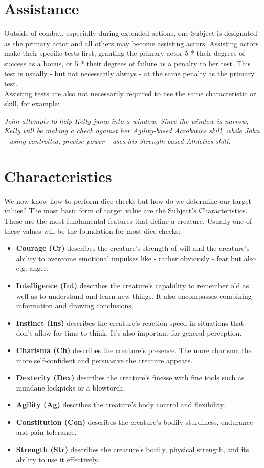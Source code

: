 \documentclass[11pt,a4paper,openany,dvipsnames]{book}
\begin{document}
	\section{Assistance}
	Outside of combat, especially during extended actions,
		one Subject is designated as the primary actor and all others may become assisting actors.
	Assisting actors make their specific tests first,
		granting the primary actor 5 * their degrees of success as a bonus,
		or 5 * their degrees of failure as a penalty to her test.
	This test is usually - but not necessarily always - at the same penalty as the primary test.
	\\%
	Assisting tests are also not necessarily required to use the same characteristic or skill, for example:\par
	\begin{exampleblock}
		\itshape
		John attempts to help Kelly jump into a window.
		Since the window is narrow,
			Kelly will be making a check against her \emph{Agility}-based Acrobatics skill,
			while John - using controlled, precise power - uses his \emph{Strength}-based Athletics skill.
	\end{exampleblock}

	\section{Characteristics}
	We now know how to perform dice checks but how do we determine our target values?
	The most basic form of target value are the Subject’s Characteristics.
	These are the most fundamental features that define a creature.
	Usually one of these values will be the foundation for most dice checks:
	\begin{itemize}
		\setlength\itemsep{-8mm}
		\item \textbf{Courage (Cr)} describes the creature’s strength of will
			and the creature’s ability to overcome emotional impulses like
			- rather obviously - fear but also e.g. anger.
		\item \textbf{Intelligence (Int)} describes the creature’s capability to remember old as well as to understand and learn new things.
			It also encompasses combining information and drawing conclusions.
		\item \textbf{Instinct (Ins)} describes the creature’s reaction speed in situations that don’t allow for time to think.
			It's also important for general perception.
		\item \textbf{Charisma (Ch)} describes the creature’s presence. The more charisma the more self-confident and persuasive the creature appears.
		\item \textbf{Dexterity (Dex)} describes the creature’s finesse with fine tools such as mundane lockpicks or a blowtorch.
		\item \textbf{Agility (Ag)} describes the creature’s body control and flexibility.
		\item \textbf{Constitution (Con)} describes the creature’s bodily sturdiness, endurance and pain tolerance.
		\item \textbf{Strength (Str)} describes the creature’s bodily, physical strength,
			and its ability to use it effectively.
	\end{itemize}
\end{document}
